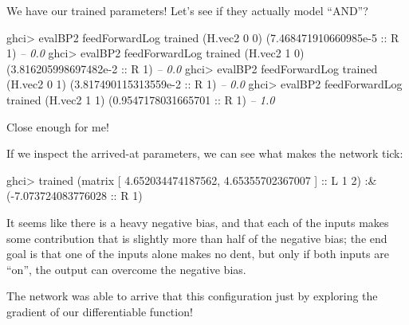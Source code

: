 \documentclass[]{article}
\newenvironment{Shaded}{}{}
\newcommand{\CommentTok}[1]{\textcolor[rgb]{0.38,0.63,0.69}{\textit{#1}}}
\newcommand{\DataTypeTok}[1]{\textcolor[rgb]{0.56,0.13,0.00}{#1}}
\newcommand{\DecValTok}[1]{\textcolor[rgb]{0.25,0.63,0.44}{#1}}
\newcommand{\FloatTok}[1]{\textcolor[rgb]{0.25,0.63,0.44}{#1}}
\newcommand{\FunctionTok}[1]{\textcolor[rgb]{0.02,0.16,0.49}{#1}}
\newcommand{\NormalTok}[1]{#1}
\newcommand{\OtherTok}[1]{\textcolor[rgb]{0.00,0.44,0.13}{#1}}
\begin{document}
We have our trained parameters! Let's see if they actually model ``AND''?

\begin{Shaded}
\begin{Highlighting}[]
\NormalTok{ghci}\FunctionTok{>}\NormalTok{ evalBP2 feedForwardLog trained (H.vec2 }\DecValTok{0} \DecValTok{0}\NormalTok{)}
\NormalTok{(}\FloatTok{7.468471910660985e-5}\OtherTok{ ::} \DataTypeTok{R} \DecValTok{1}\NormalTok{)       }\CommentTok{-- 0.0}
\NormalTok{ghci}\FunctionTok{>}\NormalTok{ evalBP2 feedForwardLog trained (H.vec2 }\DecValTok{1} \DecValTok{0}\NormalTok{)}
\NormalTok{(}\FloatTok{3.816205998697482e-2}\OtherTok{ ::} \DataTypeTok{R} \DecValTok{1}\NormalTok{)       }\CommentTok{-- 0.0}
\NormalTok{ghci}\FunctionTok{>}\NormalTok{ evalBP2 feedForwardLog trained (H.vec2 }\DecValTok{0} \DecValTok{1}\NormalTok{)}
\NormalTok{(}\FloatTok{3.817490115313559e-2}\OtherTok{ ::} \DataTypeTok{R} \DecValTok{1}\NormalTok{)       }\CommentTok{-- 0.0}
\NormalTok{ghci}\FunctionTok{>}\NormalTok{ evalBP2 feedForwardLog trained (H.vec2 }\DecValTok{1} \DecValTok{1}\NormalTok{)}
\NormalTok{(}\FloatTok{0.9547178031665701}\OtherTok{ ::} \DataTypeTok{R} \DecValTok{1}\NormalTok{)         }\CommentTok{-- 1.0}
\end{Highlighting}
\end{Shaded}

Close enough for me!

If we inspect the arrived-at parameters, we can see what makes the network tick:

\begin{Shaded}
\begin{Highlighting}[]
\NormalTok{ghci}\FunctionTok{>}\NormalTok{ trained}
\NormalTok{(matrix}
\NormalTok{ [ }\FloatTok{4.652034474187562}\NormalTok{, }\FloatTok{4.65355702367007}\NormalTok{ ]}\OtherTok{ ::} \DataTypeTok{L} \DecValTok{1} \DecValTok{2}\NormalTok{) }\FunctionTok{:&}\NormalTok{ (}\FunctionTok{-}\FloatTok{7.073724083776028}\OtherTok{ ::} \DataTypeTok{R} \DecValTok{1}\NormalTok{)}
\end{Highlighting}
\end{Shaded}

It seems like there is a heavy negative bias, and that each of the inputs makes
some contribution that is slightly more than half of the negative bias; the end
goal is that one of the inputs alone makes no dent, but only if both inputs are
``on'', the output can overcome the negative bias.

The network was able to arrive that this configuration just by exploring the
gradient of our differentiable function!
\end{document}
